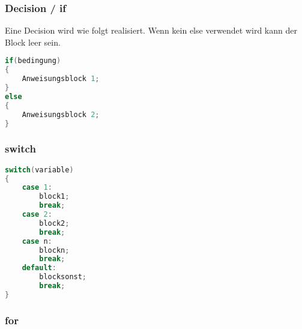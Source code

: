 \subsubsection{Decision / if}

Eine Decision wird wie folgt realisiert. Wenn kein else verwendet wird kann der Block leer sein.\\

\noindent
\begin{minipage}[c]{0.6\columnwidth} 
    \begin{center}
    \end{center}
\end{minipage}
\begin{minipage}[c]{0.4\columnwidth} 
\begin{lstlisting}[language = c]
if(bedingung)
{
    Anweisungsblock 1;
}
else
{
    Anweisungsblock 2;
}
\end{lstlisting}
\end{minipage}

\subsubsection{switch}

\noindent
\begin{minipage}{0.6\columnwidth}
    \begin{center}
    \end{center}
\end{minipage}
\begin{minipage}{0.3\columnwidth} 
\begin{lstlisting}[language = c]
switch(variable)
{
    case 1:
        block1;
        break;
    case 2:
        block2;
        break;
    case n:
        blockn;
        break;
    default:
        blocksonst;
        break;
}
\end{lstlisting}
\end{minipage}

\subsubsection{for}

